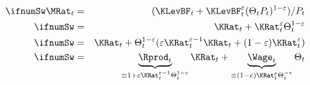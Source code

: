 \begin{eqnarray}
   \ifnumSw \MRat_{t} & = & %
(\KLevBF_{t}+\KLevBF_{t}^{\varepsilon}(\Theta_{t}{P}_{t})^{1-\varepsilon})/{P}_{t} \label{eq:decomposeM} \nonumber
\\ \ifnumSw & = & \KRat_{t}+\KRat_{t}^{\varepsilon}\Theta_{t}^{1-\varepsilon} \label{eq:trueM} \nonumber
\\ \ifnumSw & = & \KRat_{t}+\Theta_{t}^{1-\varepsilon}(\varepsilon \KRat_{t}^{\varepsilon-1} \KRat_{t} + (1-\varepsilon) \KRat_{t}^{\varepsilon}) \nonumber
\\ \ifnumSw & = & \underbrace{\Rprod_{t}}_{\equiv 1+\varepsilon \KRat_{t}^{\varepsilon-1}\Theta^{1-\varepsilon}_{t} } \KRat_{t} + \underbrace{\Wage_{t}}_{\equiv (1-\varepsilon)\KRat_{t}^{\varepsilon}\Theta_{t}^{-\varepsilon}} \Theta_{t}
\end{eqnarray}
